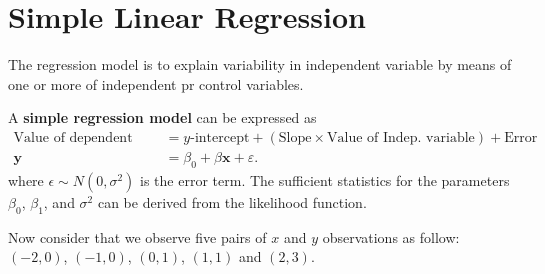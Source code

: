 \chapter{Simple Linear Regression}

The regression model is to explain variability in independent variable by 
means of one or more of independent pr control variables.

A \textbf{simple regression model} can be expressed as
\begin{align*}
    \text{Value of dependent variable} &= 
    y\text{-intercept} + (\text{Slope} \times \text{Value of Indep. variable}) + 
    \text{Error}\\
    \mathbf{y} &= \beta_0 + \beta \mathbf{x} + \varepsilon.
\end{align*}
where $\epsilon \sim N(0, \sigma^2)$ is the error term. The sufficient statistics for the parameters $\beta_0$, $\beta_1$, and $\sigma^2$ can be derived from the likelihood function.

Now consider that we observe five pairs of $x$ and $y$ observations as follow: $(-2, 0)$, $(-1, 0)$, $(0, 1)$, $(1,1)$ and $(2, 3)$.

